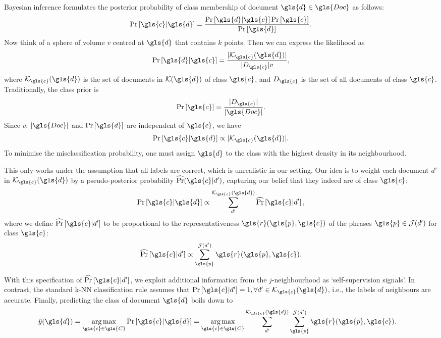 Bayesian inference formulates the posterior probability of class membership of document $\gls{d} \in \gls{Doc}$ as follows: 
\begin{align}
    \Pr\left[\gls{c}|\gls{d}\right] = \frac{\Pr\left[\gls{d}|\gls{c}\right] \Pr\left[\gls{c}\right]}{\Pr\left[\gls{d}\right]}. 
\end{align}
Now think of a sphere of volume $v$ centred at $\gls{d}$ that contains $k$ points. Then we can express the likelihood as
\begin{align}
    \Pr\left[\gls{d} | \gls{c}\right] = \frac{|\mathcal{K}_{\gls{c}}(\gls{d})|}{|D_{\gls{c}}| v},  
\end{align}
where $\mathcal{K}_{\gls{c}}(\gls{d})$ is the set of documents in $\mathcal{K}(\gls{d})$ of class $\gls{c}$, and $D_{\gls{c}}$ is the set of all documents of class $\gls{c}$. Traditionally, the class prior is
\begin{align}
    \Pr\left[\gls{c}\right] = \frac{|D_{\gls{c}}|}{|\gls{Doc}|}.
\end{align}
Since $v$, $|\gls{Doc}|$ and $\Pr\left[\gls{d}\right]$ are independent of $\gls{c}$, we have
\begin{align}
\label{eq:traditional-knn}
    \Pr\left[\gls{c}|\gls{d}\right] \propto |\mathcal{K}_{\gls{c}}(\gls{d})|.
\end{align}
To minimise the misclassification probability, one must assign $\gls{d}$ to the class with the highest density in its neighbourhood.

This only works under the assumption that all labels are correct, which is unrealistic in our setting. 
Our idea is to weight each document $d'$ in $\mathcal{K}_{\gls{c}}(\gls{d})$ by a pseudo-posterior probability $\widehat{\Pr}(\gls{c}|d')$, capturing our belief that they indeed are of class $\gls{c}$: 
\begin{align}
     \Pr\left[\gls{c}|\gls{d}\right] \propto \sum_{d'}^{\mathcal{K}_{\gls{c}}(\gls{d})} \widehat{\Pr}\left[\gls{c}|d'\right],
\end{align}
where we define $\widehat{\Pr}\left[\gls{c}|d'\right]$ to be proportional to the representativeness $\gls{r}(\gls{p},\gls{c})$ of the phrases $\gls{p} \in \mathcal{J}(d')$ for class $\gls{c}$:
\begin{align}
     \widehat{\Pr}\left[\gls{c}|d'\right] \propto \sum_{\gls{p}}^{\mathcal{J}(d')} \gls{r}(\gls{p},\gls{c}).
\end{align}

With this specification of $\widehat{\Pr}\left[\gls{c}|d'\right]$, we exploit additional information from the $j$-neighbourhood as `self-supervision signals'. In contrast, the standard k-NN classification rule assumes that  $\Pr\left[\gls{c}|d'\right] = 1, \forall d' \in \mathcal{K}_{\gls{c}}(\gls{d})$, i.e., the labels of neighbours are accurate. 
Finally, predicting the class of document $\gls{d}$ boils down to
\begin{align}
    \hat{y}(\gls{d}) &= \argmax_{\gls{c} \in \gls{C}} \Pr\left[\gls{c}|\gls{d}\right] =  \argmax_{\gls{c} \in \gls{C}} \sum_{d'}^{\mathcal{K}_{\gls{c}}(\gls{d})} \sum_{\gls{p}}^{\mathcal{J}(d')} \gls{r}(\gls{p},\gls{c}).
\end{align}

